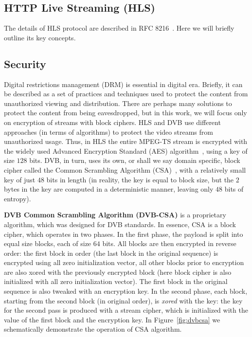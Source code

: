 \subsection{HTTP Live Streaming (HLS)} 
The details of HLS protocol are described in RFC 8216~\cite{rfc8216}.
Here we will briefly outline its key concepts.

\subsection{Security}

Digital restrictions management (DRM) is essential in digital era. Briefly, 
it can be described as a set of practices and techniques used to protect 
the content from unauthorized viewing and distribution. There are 
perhaps many solutions to protect the content from being eavesdropped, 
but in this work, we will focus only on encryption of streams 
with block ciphers. HLS and DVB use different 
approaches (in terms of algorithms) to protect the video streams from 
unauthorized usage. Thus, in HLS the entire MPEG-TS stream is encrypted 
with the widely used Advanced Encryption Standard (AES) algorithm~\cite{Stinson:Cryptography}, 
using a key of size $128$ bits. DVB, in turn, uses its own, or shall we 
say domain specific, block cipher called the Common Scrambling Algorithm 
(CSA)~\cite{breakingdvbcsa}, with a relatively small key of just $48$ bits 
in length (in reality, the key is equal to block size, but the $2$ bytes in the 
key are computed in a deterministic manner, leaving only $48$ bits of 
entropy). 

{\bf DVB Common Scrambling Algorithm (DVB-CSA)} is a proprietary 
algorithm, which was designed for DVB standards. In essence, CSA
is a block cipher, which operates in two phases. In the first 
phase, the payload is split into equal size blocks, each of size $64$ bits.
All blocks are then encrypted in reverse order: the first block in order 
(the last block in the original sequence) is encrypted using all zero 
initialization vector, all other blocks prior to encryption are also 
xored with the previously encrypted block (here block cipher is also initialized
with all zero initialization vector). The first block in the original sequence 
is also tweaked with an encryption key. In the second phase, each block, starting
from the second block (in original order), is \textit{xored} with the key: the key for the second pass 
is produced with a stream cipher, which is initialized with the value of the first block 
and the encryption key. In Figure~\ref{fig:dvbcsa} we schematically demonstrate 
the operation of CSA algorithm. 

